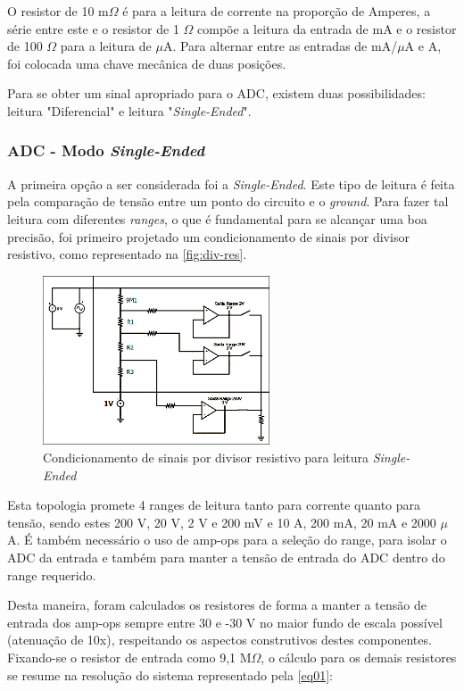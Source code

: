 O resistor de 10 m$\Omega$ é para a leitura de corrente na proporção de Amperes, a série entre este e o resistor de 1 $\Omega$ compõe a leitura da entrada de mA e o resistor de 100 $\Omega$ para a leitura de $\mu$A. Para alternar entre as entradas de mA/$\mu$A e A, foi colocada uma chave mecânica de duas posições.

Para se obter um sinal apropriado para o ADC, existem duas possibilidades: leitura "Diferencial" e leitura "\textit{Single-Ended}".

\subsubsection{ADC - Modo \textit{Single-Ended}}\label{single-ended}

A primeira opção a ser considerada foi a \textit{Single-Ended}. Este tipo de leitura é feita pela comparação de tensão entre um ponto do circuito e o \textit{ground}. Para fazer tal leitura com diferentes \textit{ranges}, o que é fundamental para se alcançar uma boa precisão, foi primeiro projetado um condicionamento de sinais por divisor resistivo, como representado na \autoref{fig:div-res}.

\begin{figure}[htb!]
    \caption{Condicionamento de sinais por divisor resistivo para leitura \textit{Single-Ended}}
    \label{fig:div-res}
    \includegraphics[width=0.6\textwidth]{figuras/div-res.png}
    \fonte{}
\end{figure}

Esta topologia promete 4 ranges de leitura tanto para corrente quanto para tensão, sendo estes 200 V, 20 V, 2 V e 200 mV e 10 A, 200 mA, 20 mA e 2000 $\mu$A. É também necessário o uso de \gls{amp-op}s para a seleção do range, para isolar o \gls{ADC} da entrada e também para manter a tensão de entrada do \gls{ADC} dentro do range requerido.

Desta maneira, foram calculados os resistores de forma a manter a tensão de entrada dos \gls{amp-op}s sempre entre 30 e -30 V no maior fundo de escala possível (atenuação de 10x), respeitando os aspectos construtivos destes componentes. Fixando-se o resistor de entrada como 9,1 M$\Omega$, o cálculo para os demais resistores se resume na resolução do sistema representado pela \autoref{eq01}:

